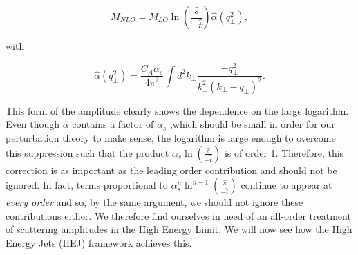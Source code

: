 \begin{equation}
M_{NLO} = M_{LO} \ln \left(\frac{\hat{s}}{-\hat{t}}\right) \hat{\alpha}(q_\perp^2),
\end{equation}

with

\begin{equation}
\label{eqn:nlocorr}
\hat{\alpha}(q_\perp^2) = \frac{C_A \alpha_s}{4 \pi^2} \int d^2 k_\perp \frac{-q_\perp^2}{k_\perp^2(k_\perp - q_\perp)^2}.
\end{equation}

This form of the amplitude clearly shows the dependence on the large logarithm. Even though $\hat{\alpha}$ contains a factor of $\alpha_s$ ,which should be small in order for our perturbation theory to make sense, the logarithm is large enough to overcome this suppression such that the product $\alpha_s \ln \left(\frac{\hat{s}}{-\hat{t}}\right)$ is of order 1. Therefore, this correction is as important as the leading order contribution and should not be ignored. In fact, terms proportional to $\alpha_s^n \ln^{n-1} \left(\frac{\hat{s}}{-\hat{t}}\right)$ continue to appear at \emph{every order} \cite{pomeronbook} and so, by the same argument, we should not ignore these contributions either. We therefore find ourselves in need of an all-order treatment of scattering amplitudes in the High Energy Limit. We will now see how the High Energy Jets (HEJ) framework achieves this. 


